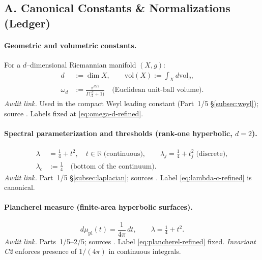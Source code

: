 \subsection*{A. Canonical Constants \& Normalizations (Ledger)}
\label{subsec:constants-refined}

\paragraph{Geometric and volumetric constants.}
For a $d$–dimensional Riemannian manifold $(X,g)$:
\begin{align}
  d &:= \dim X, \qquad
  \mathrm{vol}(X) := \int_X d\mathrm{vol}_g, \\
  \omega_d &:= \frac{\pi^{d/2}}{\Gamma\!\big(\frac d2 + 1\big)}
  \quad \text{(Euclidean unit-ball volume).} \label{eq:omega-d-refined}
\end{align}
\textit{Audit link.} Used in the compact Weyl leading constant (Part~1/5 \S\ref{subsec:weyl}); source \cite{Hormander1968}. Labels fixed at \eqref{eq:omega-d-refined}.

\paragraph{Spectral parameterization and thresholds (rank-one hyperbolic, $d=2$).}
\begin{align}
  \lambda &= \tfrac14 + t^2, \quad t\in\mathbb R \;\text{(continuous)}, \qquad
  \lambda_j = \tfrac14 + t_j^2 \;\text{(discrete)}, \\
  \lambda_c &:= \tfrac14 \quad \text{(bottom of the continuum).} \label{eq:lambda-c-refined}
\end{align}
\textit{Audit link.} Part~1/5 \S\ref{subsec:laplacian}; sources \cite{Hejhal1983II,Iwaniec2002,LaxPhillips1976}. Label \eqref{eq:lambda-c-refined} is canonical.

\paragraph{Plancherel measure (finite-area hyperbolic surfaces).}
\begin{equation}
  d\mu_{\mathrm{pl}}(t) = \frac{1}{4\pi}\,dt, \qquad \lambda=\tfrac14 + t^2.
  \label{eq:plancherel-refined}
\end{equation}
\textit{Audit link.} Parts~1/5–2/5; sources \cite{Hejhal1983II}. Label \eqref{eq:plancherel-refined} fixed. \emph{Invariant C2} enforces presence of $1/(4\pi)$ in continuous integrals.

